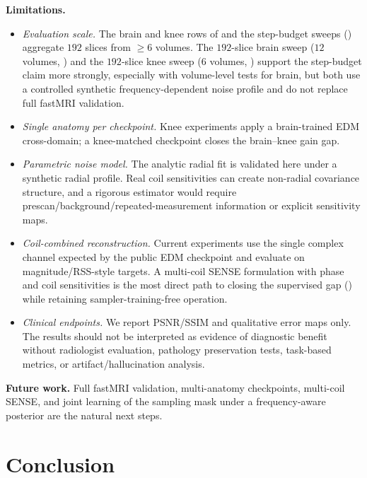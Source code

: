 \documentclass[10pt,twocolumn,letterpaper]{article}
\begin{document}
\textbf{Limitations.}
\begin{itemize}
  \item \textit{Evaluation scale.} The brain and knee rows of
   and the step-budget sweeps
  () aggregate $192$ slices from $\geq 6$
  volumes. The $192$-slice brain sweep ($12$ volumes,
  ) and the $192$-slice knee sweep ($6$ volumes,
  ) support the step-budget claim more strongly,
  especially with volume-level tests for brain, but both use a controlled
  synthetic frequency-dependent noise profile and do not replace full fastMRI
  validation.
  \item \textit{Single anatomy per checkpoint.} Knee experiments apply a
  brain-trained EDM cross-domain; a knee-matched checkpoint closes the
  brain--knee gain gap.
  \item \textit{Parametric noise model.} The analytic radial fit
   is validated here under a synthetic radial profile.
  Real coil sensitivities can create non-radial covariance structure, and a
  rigorous estimator would require prescan/background/repeated-measurement
  information or explicit sensitivity maps.
  \item \textit{Coil-combined reconstruction.} Current experiments use the
  single complex channel expected by the public EDM checkpoint and evaluate on
  magnitude/RSS-style targets. A multi-coil SENSE formulation with phase and
  coil sensitivities is the most direct path to closing the supervised gap
  () while retaining sampler-training-free operation.
  \item \textit{Clinical endpoints.} We report PSNR/SSIM and qualitative error
  maps only. The results should not be interpreted as evidence of diagnostic
  benefit without radiologist evaluation, pathology preservation tests,
  task-based metrics, or artifact/hallucination analysis.
\end{itemize}

\textbf{Future work.} Full fastMRI validation, multi-anatomy checkpoints,
multi-coil SENSE, and joint learning of the sampling mask under a
frequency-aware posterior are the natural next steps.

\section{Conclusion}
\label{sec:conclusion}
\end{document}
